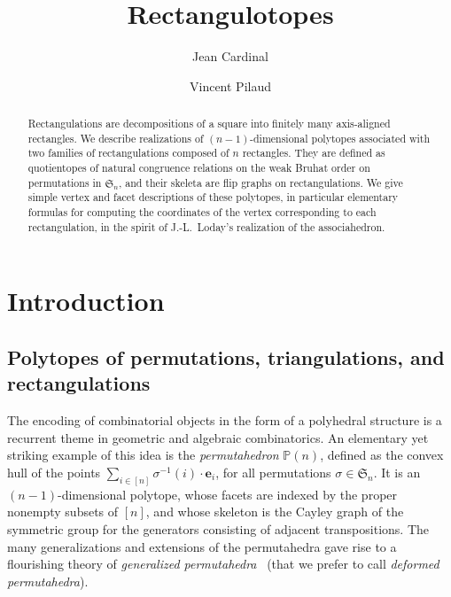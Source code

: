 \documentclass{amsart}
\title{Rectangulotopes}
\author{Jean Cardinal}
\author{Vincent Pilaud}
\theoremstyle{definition}
\renewcommand{\b}[1]{{\boldsymbol{#1}}} %
\newcommand{\f}[1]{\mathfrak{#1}} %
\newcommand{\darkblue}{\color{darkblue}} %
\newcommand{\defn}[1]{\textsl{\darkblue #1}} %
\newcommand{\polytope}[1]{\mathds{#1}} %
\newcommand{\Perm}{\polytope{P}} %
\begin{document}
\begin{abstract}
  Rectangulations are decompositions of a square into finitely many axis-aligned rectangles.
  We describe realizations of $(n-1)$-dimensional polytopes associated with two families of rectangulations composed of $n$ rectangles.
  They are defined as quotientopes of natural congruence relations on the weak Bruhat order on permutations in $\f{S}_n$, and their skeleta are flip graphs on rectangulations.
  We give simple vertex and facet descriptions of these polytopes, in particular elementary formulas for computing the coordinates of the vertex corresponding to each rectangulation, in the spirit of J.-L.~Loday's realization of the associahedron.
\end{abstract}

\maketitle

\tableofcontents


\section{Introduction}

\subsection{Polytopes of permutations, triangulations, and rectangulations}

The encoding of combinatorial objects in the form of a polyhedral structure is a recurrent theme in geometric and algebraic combinatorics.
An elementary yet striking example of this idea is the \defn{permutahedron} $\Perm (n)$, defined as the convex hull of the points $\sum_{i\in [n]} \sigma^{-1}(i)\cdot \b{e}_i$, for all permutations $\sigma \in \f{S}_n$.
It is an $(n-1)$-dimensional polytope, whose facets are indexed by the proper nonempty subsets of $[n]$, and whose skeleton is the Cayley graph of the symmetric group for the generators consisting of adjacent transpositions.
The many generalizations and extensions of the permutahedra gave rise to a flourishing theory of \defn{generalized permutahedra}~\cite{Postnikov} (that we prefer to call \defn{deformed permutahedra}).
\end{document}
